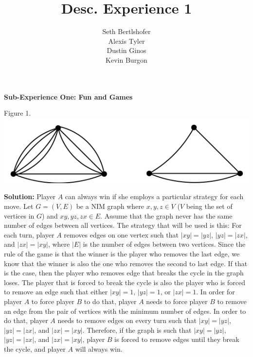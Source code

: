 \documentclass[10pt,a4paper]{report}
\author{Seth Bertlshofer\\Alexis Tyler\\Dustin Ginos\\Kevin Burgon}
\title{Desc. Experience 1}
\begin{document}
	\maketitle
	\textbf{Sub-Experience One: Fun and Games}\\
		\begin{center}
			Figure 1.\\
			\includegraphics[scale=.5]{e1.png}
			\newline
			\newline
		\end{center}
		
	\textbf{Solution: }Player $A$ can always win if she employs a particular strategy for each move.  Let $G = (V, E)$ be a NIM graph where $x, y, z \in V$ ($V$ being the set of vertices in $G$) and $xy, yz, zx \in E$.  Assume that the graph never has the same number of edges between all vertices. The strategy that will be used is this: For each turn, player $A$ removes edges on one vertex such that $|xy| = |yz|$, $|yz| = |zx|$, and $|zx| = |xy|$, where $|E|$ is the number of edges between two vertices. Since the rule of the game is that the winner is the player who removes the last edge, we know that the winner is also the one who removes the second to last edge.  If that is the case, then the player who removes edge that breaks the cycle in the graph loses. The player that is forced to break the cycle is also the player who is forced to remove an edge such that either $|xy| = 1$, $|yz| = 1$, or $|zx| = 1$.  In order for player $A$ to force player $B$ to do that, player $A$ needs to force player $B$ to remove an edge from the pair of vertices with the minimum number of edges.  In order to do that, player $A$ needs to remove edges on every turn such that $|xy| = |yz|$, $|yz| = |zx|$, and $|zx| = |xy|$. Therefore, if the graph is such that $|xy| = |yz|$, $|yz| = |zx|$, and $|zx| = |xy|$, player $B$ is forced to remove edges until they break the cycle, and player $A$ will always win.\\
\end{document}
